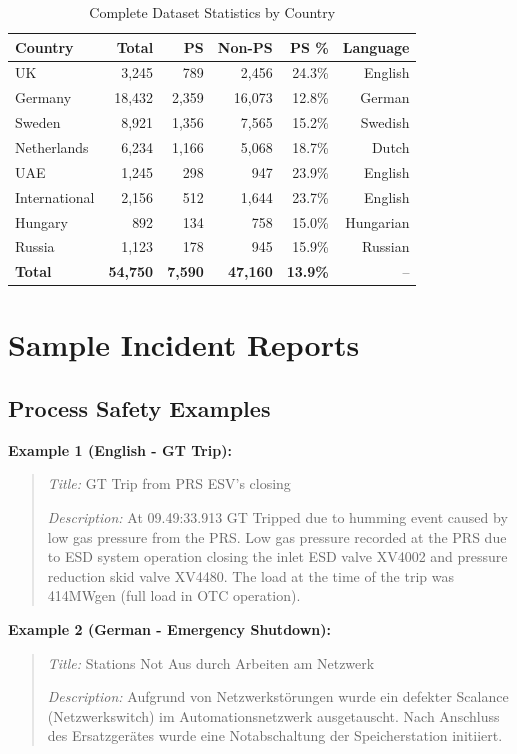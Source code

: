 \documentclass[11pt, titlepage, bibliography=totoc]{scrreprt}
\begin{document}
\begin{table}[htbp]
\centering
\caption{Complete Dataset Statistics by Country}
\label{tab:appendix-dataset-stats}
\begin{tabular}{@{}lrrrrr@{}}
\toprule
\textbf{Country} & \textbf{Total} & \textbf{PS} & \textbf{Non-PS} & \textbf{PS \%} & \textbf{Language} \\
\midrule
UK & 3,245 & 789 & 2,456 & 24.3\% & English \\
Germany & 18,432 & 2,359 & 16,073 & 12.8\% & German \\
Sweden & 8,921 & 1,356 & 7,565 & 15.2\% & Swedish \\
Netherlands & 6,234 & 1,166 & 5,068 & 18.7\% & Dutch \\
UAE & 1,245 & 298 & 947 & 23.9\% & English \\
International & 2,156 & 512 & 1,644 & 23.7\% & English \\
Hungary & 892 & 134 & 758 & 15.0\% & Hungarian \\
Russia & 1,123 & 178 & 945 & 15.9\% & Russian \\
\midrule
\textbf{Total} & \textbf{54,750} & \textbf{7,590} & \textbf{47,160} & \textbf{13.9\%} & -- \\
\bottomrule
\end{tabular}
\end{table}

\section{Sample Incident Reports}

\subsection{Process Safety Examples}

\textbf{Example 1 (English - GT Trip):}
\begin{quote}
\textit{Title:} GT Trip from PRS ESV's closing

\textit{Description:} At 09.49:33.913 GT Tripped due to humming event caused by low gas pressure from the PRS. Low gas pressure recorded at the PRS due to ESD system operation closing the inlet ESD valve XV4002 and pressure reduction skid valve XV4480. The load at the time of the trip was 414MWgen (full load in OTC operation).
\end{quote}

\textbf{Example 2 (German - Emergency Shutdown):}
\begin{quote}
\textit{Title:} Stations Not Aus durch Arbeiten am Netzwerk

\textit{Description:} Aufgrund von Netzwerkstörungen wurde ein defekter Scalance (Netzwerkswitch) im Automationsnetzwerk ausgetauscht. Nach Anschluss des Ersatzgerätes wurde eine Notabschaltung der Speicherstation initiiert.
\end{quote}
\end{document}
